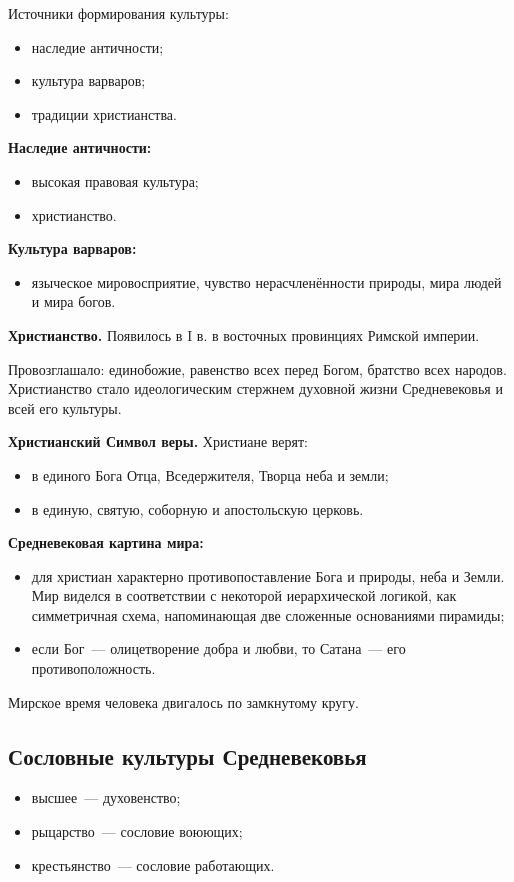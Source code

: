 \documentclass[a4paper, 12pt]{article}
\begin{document}
Источники формирования культуры:
\begin{itemize}[noitemsep]
  \item наследие античности;
  \item культура варваров;
  \item традиции христианства.
\end{itemize}

\textbf{Наследие античности:}
\begin{itemize}[noitemsep]
  \item высокая правовая культура;
  \item христианство.
\end{itemize}

\textbf{Культура варваров:}
\begin{itemize}[noitemsep]
  \item языческое мировосприятие, чувство нерасчленённости природы, мира
  людей и мира богов.
\end{itemize}

\textbf{Христианство.} Появилось в I в.
в восточных провинциях Римской империи.

Провозглашало: единобожие, равенство всех перед Богом, братство всех
народов. Христианство стало идеологическим стержнем духовной жизни
Средневековья и всей его культуры.

\textbf{Христианский Символ веры.} Христиане верят:
\begin{itemize}[noitemsep]
  \item в единого Бога Отца, Вседержителя, Творца неба и земли;
  \item в единую, святую, соборную и апостольскую церковь.
\end{itemize}

\textbf{Средневековая картина мира:}
\begin{itemize}[noitemsep]
  \item для христиан характерно противопоставление Бога и природы, неба
  и Земли. Мир виделся в соответствии с некоторой иерархической логикой, как
  симметричная схема, напоминающая две сложенные основаниями пирамиды;
  \item если Бог~--- олицетворение добра и любви, то Сатана~--- его
  противоположность.
\end{itemize}

Мирское время человека двигалось по замкнутому кругу.

\subsection{Сословные культуры Средневековья}
\begin{itemize}[noitemsep]
  \item высшее~--- духовенство;
  \item рыцарство~--- сословие воюющих;
  \item крестьянство~--- сословие работающих.
\end{itemize}
\end{document}
